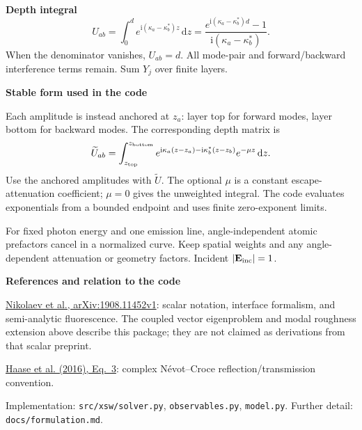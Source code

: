 \documentclass[11pt,a4paper]{article}
\newcommand{\E}{\mathbf E}
\newcommand{\ii}{\mathrm i}
\newcommand{\dd}{\mathrm d}
\begin{document}
\textbf{Depth integral}
\begin{equation}
 \boxed{U_{ab}=\int_0^d e^{\ii(\kappa_a-\kappa_b^*)z}\,\dd z
 =\frac{e^{\ii(\kappa_a-\kappa_b^*)d}-1}{\ii(\kappa_a-\kappa_b^*)}}.
\end{equation}
When the denominator vanishes, $U_{ab}=d$. All mode-pair and
forward/backward interference terms remain. Sum $Y_j$ over finite layers.

\textbf{Stable form used in the code}

Each amplitude is instead anchored at $z_a$: layer top for forward modes,
layer bottom for backward modes. The corresponding depth matrix is
\begin{equation}
 \widetilde U_{ab}=\int_{z_{\rm top}}^{z_{\rm bottom}}
 e^{\ii\kappa_a(z-z_a)-\ii\kappa_b^*(z-z_b)}e^{-\mu z}\,\dd z.
\end{equation}
Use the anchored amplitudes with $\widetilde U$. The optional $\mu$ is a constant
escape-attenuation coefficient; $\mu=0$ gives the unweighted integral.
The code evaluates exponentials from a bounded endpoint and uses finite
zero-exponent limits.

For fixed photon energy and one emission line, angle-independent atomic
prefactors cancel in a normalized curve. Keep spatial weights and any
angle-dependent attenuation or geometry factors. Incident $|\E_{\rm inc}|=1$.

\medskip
{\small\textbf{References and relation to the code}\par
\href{https://arxiv.org/html/1908.11452v1}{Nikolaev et al., arXiv:1908.11452v1}:
scalar notation, interface formalism, and semi-analytic fluorescence.
The coupled vector eigenproblem and modal roughness extension above describe
this package; they are not claimed as derivations from that scalar preprint.\par
\href{https://doi.org/10.1107/S1600576716015776}{Haase et al. (2016), Eq.~3}:
complex N\'evot--Croce reflection/transmission convention.\par
Implementation: \texttt{src/xsw/solver.py}, \texttt{observables.py},
\texttt{model.py}. Further detail: \texttt{docs/formulation.md}.}
\end{document}
